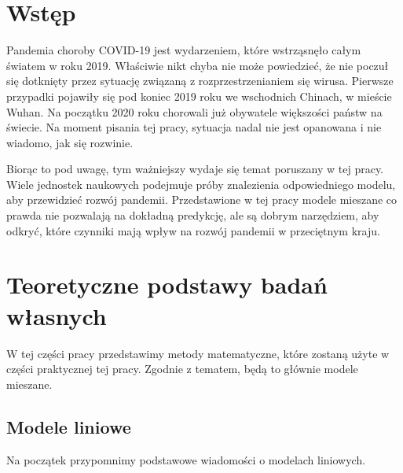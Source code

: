 \documentclass[12pt]{mwbk}
\theoremstyle{plain}
\theoremstyle{definition}
\theoremstyle{remark}
\begin{document}



\tableofcontents


\chapter*{Wstęp}




Pandemia choroby COVID-19 jest wydarzeniem, które wstrząsnęło całym światem w roku 2019. Właściwie nikt chyba nie może powiedzieć, że nie poczuł się dotknięty przez sytuację związaną z rozprzestrzenianiem się wirusa. Pierwsze przypadki pojawiły się pod koniec 2019 roku we wschodnich Chinach, w mieście Wuhan. Na początku 2020 roku chorowali już obywatele większości państw na świecie. Na moment pisania tej pracy, sytuacja nadal nie jest opanowana i nie wiadomo, jak się rozwinie.

Biorąc to pod uwagę, tym ważniejszy wydaje się temat poruszany w tej pracy. Wiele jednostek naukowych podejmuje próby znalezienia odpowiedniego modelu, aby przewidzieć rozwój pandemii. Przedstawione w tej pracy modele mieszane co prawda nie pozwalają na dokładną predykcję, ale są dobrym narzędziem, aby odkryć, które czynniki mają wpływ na rozwój pandemii w przeciętnym kraju.











\chapter{Teoretyczne podstawy badań własnych}
W tej części pracy przedstawimy metody matematyczne, które zostaną użyte w części praktycznej tej pracy. Zgodnie z tematem, będą to głównie modele mieszane.
\section{Modele liniowe}
Na początek przypomnimy podstawowe wiadomości o modelach liniowych.
\end{document}
